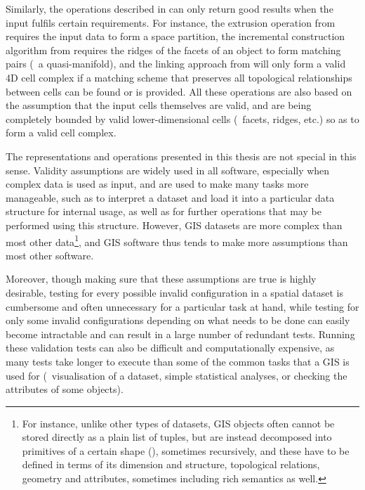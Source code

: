 Similarly, the operations described in  can only return good results when the input fulfils certain requirements.
For instance, the extrusion operation from  requires the input data to form a space partition, the incremental construction algorithm from  requires the ridges of the facets of an object to form matching pairs (\ie\ a quasi-manifold), and the linking approach from  will only form a valid 4D cell complex if a matching scheme that preserves all topological relationships between cells can be found or is provided.
All these operations are also based on the assumption that the input cells themselves are valid, and are being completely bounded by valid lower-dimensional cells (\ie\ facets, ridges, etc.) so as to form a valid cell complex.

The representations and operations presented in this thesis are not special in this sense.
Validity assumptions are widely used in all software, especially when complex data is used as input, and are used to make many tasks more manageable, such as to interpret a dataset and load it into a particular data structure for internal usage, as well as for further operations that may be performed using this structure.
However, GIS datasets are more complex than most other data\footnote{For instance, unlike other types of datasets, GIS objects often cannot be stored directly as a plain list of tuples, but are instead decomposed into primitives of a certain shape (), sometimes recursively, and these have to be defined in terms of its dimension and structure, topological relations, geometry and attributes, sometimes including rich semantics as well.}, and GIS software thus tends to make more assumptions than most other software.

Moreover, though making sure that these assumptions are true is highly desirable, testing for every possible invalid configuration in a spatial dataset is cumbersome and often unnecessary for a particular task at hand, while testing for only some invalid configurations depending on what needs to be done can easily become intractable and can result in a large number of redundant tests.
Running these validation tests can also be difficult and computationally expensive, as many tests take longer to execute than some of the common tasks that a GIS is used for (\eg\ visualisation of a dataset, simple statistical analyses, or checking the attributes of some objects).


